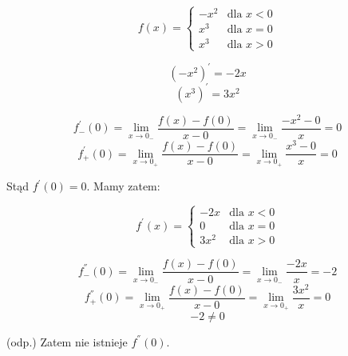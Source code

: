 \documentclass{article}
\begin{document}
$$f(x)=\left\{ \begin{array}{rl}
-x^{2} & \textrm{dla $x<0$} \\ x^{3} & \textrm{dla $x = 0$} \\ x^{3} & \textrm{dla $x>0$} \end{array}$$

$$(-x^{2})^{'} = -2x$$
$$(x^{3})^{'} = 3x^{2}$$

$$f^{'}_{-}(0) = \lim_{x \to 0_{-}} \frac{f(x) - f(0)}{x-0} =  \lim_{x \to 0_{-}} \frac{-x^{2}-0}{x} = 0$$
$$f^{'}_{+}(0) = \lim_{x \to 0_{+}} \frac{f(x) - f(0)}{x-0} =  \lim_{x \to 0_{+}} \frac{x^{3}-0}{x} = 0$$

Stąd $f^{'}(0) = 0$. Mamy zatem:

$$f^{'}(x)=\left\{ \begin{array}{rl}
-2x & \textrm{dla $x<0$} \\ 0 & \textrm{dla $x = 0$} \\ 3x^{2} & \textrm{dla $x>0$} \end{array}$$

$$f^{''}_{-}(0) = \lim_{x \to 0_{-}} \frac{f(x) - f(0)}{x-0} =  \lim_{x \to 0_{-}} \frac{-2x}{x} = -2$$
$$f^{''}_{+}(0) = \lim_{x \to 0_{+}} \frac{f(x) - f(0)}{x-0} =  \lim_{x \to 0_{+}} \frac{3x^{2}}{x} = 0$$
$$-2 \neq 0$$

\centering
(odp.) Zatem nie istnieje $f^{''}(0)$.
\end{document}
